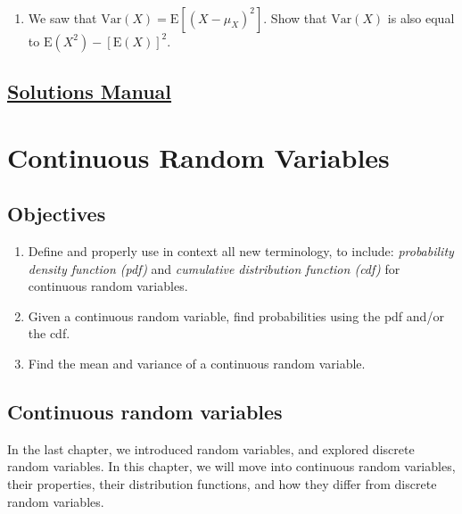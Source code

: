 \documentclass[
  letterpaper,
  DIV=11,
  numbers=noendperiod]{scrreprt}
\providecommand{\tightlist}{%
  \setlength{\itemsep}{0pt}\setlength{\parskip}{0pt}}\usepackage{longtable,booktabs,array}
\begin{document}
~

\begin{enumerate}
\def\labelenumi{\arabic{enumi}.}
\setcounter{enumi}{5}
\tightlist
\item
  We saw that \(\mbox{Var}(X)=\mbox{E}[(X-\mu_X)^2]\). Show that
  \(\mbox{Var}(X)\) is also equal to \(\mbox{E}(X^2)-[\mbox{E}(X)]^2\).
\end{enumerate}

\section*{\texorpdfstring{\href{https://ds-usafa.github.io/CPS-Solutions-Manual/RANDVAR.html}{Solutions
Manual}}{Solutions Manual}}\label{solutions-manual-10}


\chapter{Continuous Random Variables}\label{CONRANDVAR}

\section{Objectives}\label{objectives-11}

\begin{enumerate}
\def\labelenumi{\arabic{enumi})}
\item
  Define and properly use in context all new terminology, to include:
  \emph{probability density function (pdf)} and \emph{cumulative
  distribution function (cdf)} for continuous random variables.
\item
  Given a continuous random variable, find probabilities using the pdf
  and/or the cdf.
\item
  Find the mean and variance of a continuous random variable.
\end{enumerate}

\section{Continuous random
variables}\label{continuous-random-variables-1}

In the last chapter, we introduced random variables, and explored
discrete random variables. In this chapter, we will move into continuous
random variables, their properties, their distribution functions, and
how they differ from discrete random variables.
\end{document}
